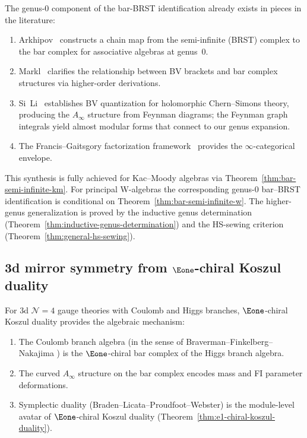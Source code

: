 \begin{remark}\label{rem:brst-chain-map-pieces}
The genus-$0$ component of the bar-BRST identification already exists
in pieces in the literature:
\begin{enumerate}[label=(\roman*)]
\item Arkhipov~\cite{Arkhipov97} constructs a chain map from the
 semi-infinite (BRST) complex to the bar complex for associative
 algebras at genus~$0$.
\item Markl~\cite{Markl23} clarifies the relationship between BV
 brackets and bar complex structures via higher-order derivations.
\item Si~Li~\cite{SiLi12, SiLi16} establishes BV quantization for holomorphic
 Chern--Simons theory, producing the $A_\infty$ structure from
 Feynman diagrams; the Feynman graph integrals yield almost modular
 forms that connect to our genus expansion.
\item The Francis--Gaitsgory factorization framework~\cite{FG12}
 provides the $\infty$-categorical envelope.
\end{enumerate}
This synthesis is fully achieved for Kac--Moody algebras via
Theorem~\ref{thm:bar-semi-infinite-km}. For principal
W-algebras the corresponding genus-$0$ bar--BRST identification is
conditional on Theorem~\ref{thm:bar-semi-infinite-w}. The
higher-genus generalization is proved by
the inductive genus determination
(Theorem~\ref{thm:inductive-genus-determination})
and the HS-sewing criterion
(Theorem~\ref{thm:general-hs-sewing}).
\end{remark}

\subsection{\texorpdfstring{3d mirror symmetry from $\Eone$-chiral Koszul duality}{3d mirror symmetry from E1-chiral Koszul duality}}
\label{subsec:3d-mirror}

\begin{conjecture}\label{conj:3d-mirror}
For 3d $\mathcal{N}=4$ gauge theories with Coulomb and Higgs
branches, $\Eone$-chiral Koszul duality provides the algebraic
mechanism:
\begin{enumerate}[label=\textup{(\roman*)}]
\item The Coulomb branch algebra \textup{(}in the sense of
 Braverman--Finkelberg--Nakajima \cite{BFN18}\textup{)}
 is the $\Eone$-chiral bar complex of the Higgs branch algebra.
\item The curved $A_\infty$ structure on the bar complex
 encodes mass and FI parameter deformations.
\item Symplectic duality \textup{(}Braden--Licata--Proudfoot--Webster\textup{)}
 is the module-level avatar of $\Eone$-chiral Koszul duality
 \textup{(}Theorem~\textup{\ref{thm:e1-chiral-koszul-duality})}.
\end{enumerate}
\end{conjecture}

